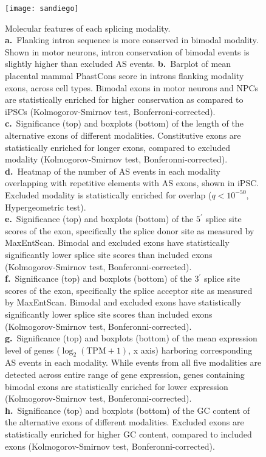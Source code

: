 \begin{figure}[h] 
  \centering
  \texttt{[image: sandiego]}
  \caption[Molecular features of each splicing modality.]{
Molecular features of each splicing modality.\\
\textbf{a.}~Flanking intron sequence is more conserved in  bimodal modality. Shown in motor neurons,  intron conservation of bimodal events is slightly higher than excluded AS events.
\textbf{b.}~Barplot of mean placental mammal PhastCons score in introns flanking modality exons, across cell types. Bimodal exons in motor neurons  and NPCs are statistically enriched for higher conservation as compared to iPSCs (Kolmogorov-Smirnov test, Bonferroni-corrected).\\
\textbf{c.}~Significance (top) and boxplots (bottom) of the length of the alternative exons of different modalities. Constitutive exons are statistically enriched for longer exons, compared to excluded modality (Kolmogorov-Smirnov test, Bonferonni-corrected).\\
\textbf{d.}~Heatmap of the number of AS events in each modality overlapping with repetitive elements with AS exons, shown in iPSC. Excluded modality is statistically enriched for overlap ($q < 10^{-50}$, Hypergeometric test).\\
\textbf{e.}~Significance (top) and boxplots (bottom) of the $5^\prime$ splice site scores of the exon, specifically the splice donor site as measured by MaxEntScan. Bimodal and excluded exons have statistically significantly lower splice site scores than included exons (Kolmogorov-Smirnov test, Bonferonni-corrected).\\
\textbf{f.}~Significance (top) and boxplots (bottom) of the $3^\prime$ splice site scores of the exon, specifically the splice acceptor site as measured by MaxEntScan. Bimodal and excluded exons have statistically significantly lower splice site scores than included exons (Kolmogorov-Smirnov test, Bonferonni-corrected).\\
\textbf{g.}~Significance (top) and boxplots (bottom) of the mean expression level of genes ($\log_2(\mathrm{TPM}+1)$, x axis) harboring corresponding AS events in each modality. While events from all five modalities are detected across entire range of gene expression, genes containing bimodal exons are statistically enriched for lower expression (Kolmogorov-Smirnov test, Bonferonni-corrected).\\
\textbf{h.}~Significance (top) and boxplots (bottom) of the GC content of the alternative exons of different modalities. Excluded exons are statistically enriched for higher GC content, compared to included exons (Kolmogorov-Smirnov test, Bonferonni-corrected).\\
}
\end{figure}
